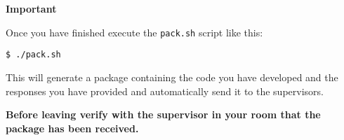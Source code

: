 \documentclass{article}
\begin{document}
\vspace{1cm}


{\huge \bf Important}

Once you have finished execute the \texttt{pack.sh} script like this:
\begin{verbatim}
$ ./pack.sh
\end{verbatim}

This will generate a package containing the code you have developed
and the responses you have provided and automatically send it to the
supervisors.

{\bf Before leaving verify with the supervisor in your room that the
package has been received.}
\end{document}
